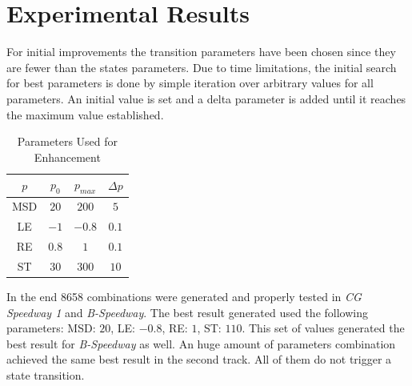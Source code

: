 \section{Experimental Results}
For initial improvements the transition parameters have been chosen since they are fewer than the states parameters. Due to time limitations, the initial search for best parameters is done by simple
iteration over arbitrary values for all parameters. An initial value is set and a delta parameter is added until it reaches the maximum value established.


\begin{table}[h]
\renewcommand{\arraystretch}{1.3}
\caption{Parameters Used for Enhancement}
\label{parameter_table}
\centering
\begin{tabular}{c||c||c||c}
\hline \bfseries $p$ &\bfseries $p_0$ &\bfseries $ p_{max}$ &\bfseries $\Delta p$ \\
\hline
\hline MSD & $20$ & $200$ & $5$ \\ 
\hline LE & $-1$ & $-0.8$ & $0.1$ \\ 
\hline RE & $0.8$ & $1$ & $0.1$ \\ 
\hline ST & $30$ & $300$ & $10$ \\ 
\hline 
\end{tabular} 
\end{table}

In the end 8658 combinations were generated and properly tested in \textit{CG Speedway 1} and \textit{B-Speedway}. The best result generated used the following parameters: MSD: $20$, LE: $-0.8$, RE: $1$, ST: $110$. This set of values generated the best result for \textit{B-Speedway} as well. An huge amount of parameters combination achieved the same best result in the second track. All of them do not trigger a state transition.






